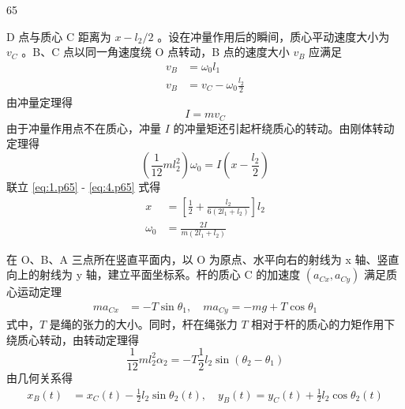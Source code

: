 \begin{solution}{65}
    \begin{subsolution}
        D 点与质心 C 距离为 $x - l_{2}/2$ 。设在冲量作用后的瞬间，质心平动速度大小为 $v_{C}$ 。B、C 点以同一角速度绕 O 点转动，B 点的速度大小 $v_{B}$ 应满足
        \begin{align}
            v_{B} &= \omega_{0} l_{1} \label{eq:1.p65} \\
            v_{B} &= v_{C} - \omega_{0} \frac{l_{2}}{2} \label{eq:2.p65}
        \end{align}
        由冲量定理得
        \begin{equation}
            I = m v_{C} \label{eq:3.p65}
        \end{equation}
        由于冲量作用点不在质心，冲量 $I$ 的冲量矩还引起杆绕质心的转动。由刚体转动定理得
        \begin{equation}
            \left( \frac{1}{12} m l_{2}^{2} \right) \omega_{0} = I \left( x - \frac{l_{2}}{2} \right) \label{eq:4.p65}
        \end{equation}
        联立 \eqref{eq:1.p65} - \eqref{eq:4.p65} 式得
        \begin{align}
            x &= \left[ \frac{1}{2} + \frac{l_{2}}{6(2l_{1} + l_{2})} \right] l_{2} \label{eq:5.p65} \\
            \omega_{0} &= \frac{2I}{m(2l_{1} + l_{2})} \label{eq:6.p65}
        \end{align}
    \end{subsolution}
    \begin{subsolution}
        在 O、B、A 三点所在竖直平面内，以 O 为原点、水平向右的射线为 x 轴、竖直向上的射线为 y 轴，建立平面坐标系。杆的质心 C 的加速度 $(a_{Cx}, a_{Cy})$ 满足质心运动定理
        \begin{align}
            m a_{Cx} &= -T \sin \theta_{1}, \quad m a_{Cy} = -mg + T \cos \theta_{1} \label{eq:7.p65}
        \end{align}
        式中，$T$ 是绳的张力的大小。同时，杆在绳张力 $T$ 相对于杆的质心的力矩作用下绕质心转动，由转动定理得
        \begin{equation}
            \frac{1}{12} m l_{2}^{2} \alpha_{2} = -T \frac{1}{2} l_{2} \sin(\theta_{2} - \theta_{1}) \label{eq:8.p65}
        \end{equation}
        由几何关系得
        \begin{align}
            x_{B}(t) &= x_{C}(t) - \frac{1}{2} l_{2} \sin \theta_{2}(t), \quad y_{B}(t) = y_{C}(t) + \frac{1}{2} l_{2} \cos \theta_{2}(t) \label{eq:9.p65}

\end{align}
\end{subsolution}
\end{solution}
